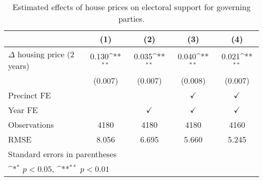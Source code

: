 \begin{table}[htbp]\centering
\def\sym#1{\ifmmode^{#1}\else\(^{#1}\)\fi}
\caption{Estimated effects of house prices on electoral support for governing parties.} \label{prelagiv}
\begin{tabular}{l*{4}{c}}
\hline\hline
                    &\multicolumn{1}{c}{(1)}        &\multicolumn{1}{c}{(2)}        &\multicolumn{1}{c}{(3)}        &\multicolumn{1}{c}{(4)}        \\
\hline
$\Delta$ housing price (2 years)&       0.130\sym{**}&       0.035\sym{**}&       0.040\sym{**}&       0.021\sym{**}\\
                    &     (0.007)        &     (0.007)        &     (0.008)        &     (0.007)        \\
[1em]
\hline Precinct FE  &                    &                    &$\checkmark$        &$\checkmark$        \\
[1em]
Year FE             &                    &$\checkmark$        &$\checkmark$        &$\checkmark$        \\
\hline
Observations        &        4180        &        4180        &        4180        &        4160        \\
RMSE                &       8.056        &       6.695        &       5.660        &       5.245        \\
\hline\hline
\multicolumn{5}{l}{\footnotesize Standard errors in parentheses}\\
\multicolumn{5}{l}{\footnotesize \sym{*} \(p<0.05\), \sym{**} \(p<0.01\)}\\
\end{tabular}
\end{table}
